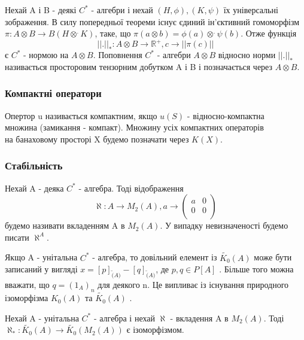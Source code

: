 Нехай A і B - деякі $C^*$ - алгебри і нехай $(H,\phi),(K, \psi)$ їх універсальні \\ зображення.
В силу попередньої теореми існує єдиний ін'єктивний гомоморфізм $\pi: A \otimes B \to B(H \otimes^. K)$,
таке, що $\pi(a \otimes b) = \phi(a) \otimes^. \psi(b)$.
Отже функція
\begin{equation*}
    ||.||_*: A \otimes B \to \mathbb{R}^+, c \to ||\pi(c)||
\end{equation*}
є $C^*$ - нормою на $A \otimes B$.
Поповнення $C^*$ - алгебри $A \otimes B$ відносно норми $||.||_*$ називається просторовим тензорним добутком A і B і
позначається через $A \otimes B$.

\subsubsection{Компактні оператори}

Опертор u називається компактним, якщо $u(S)$ - відносно-компактна \\ множина (замикання - компакт).
Множину усіх компактних операторів \\ на банаховому просторі X будемо позначати через $K(X)$.

\subsubsection{Стабільність}
Нехай A - деяка $C^*$ - алгебра.
Тоді відображення
\begin{equation*}
    \aleph: A \to M_2(A), a \to \begin{pmatrix}
                                    a & 0 \\
                                    0 & 0 \\
    \end{pmatrix}
\end{equation*}
будемо називати вкладенням A в $M_2(A)$.
У випадку невизначеності будемо писати $\aleph^A$.

\begin{remark}
    Якщо A - унітальна $C^*$ - алгебра, то довільний елемент із $ \widetilde{K_0}(A) $ може бути записаний у вигляді
    $x = [p]_{\widetilde(A)} - [q]_{\widetilde(A)}$, де $p, q \in P[A]$ .
    Більше того можна вважати, що $q = (1_A)_n$ для деякого n.
    Це випливає із існування природного ізоморфізма $ K_0(A) $ та $ \widetilde{K_0}(A) $ .
\end{remark}

\begin{theorem}
    Нехай A - унітальна $C^*$ - алгебра і нехай $\aleph$ - вкладення A в $M_2(A)$.
    Тоді $\aleph_*: \widetilde{K_0}(A) \to \widetilde{K_0}(M_2(A))$ є ізоморфізмом.

\end{theorem}

